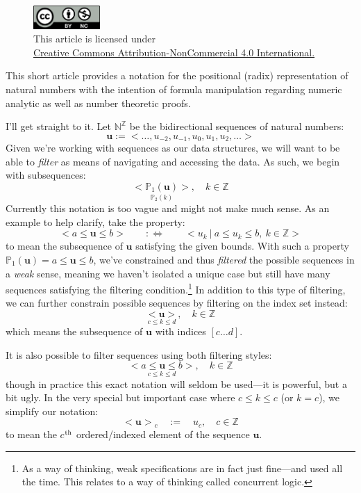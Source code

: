 \documentclass[twoside]{article}
\renewcommand{\th}{$ ^{\mbox{\scriptsize th}} $ }
\newcommand{\seq}[1][u]{\ensuremath{<\!#1\!>}}
\newcommand{\bseq}[1][u]{\ensuremath{<\!\!\bm{#1}\!\!>}}
\begin{document}
\begin{figure}[h]
\centering
\includegraphics[width=1in]{cc-by-nc.png}\\[0.1in]
\tiny This article is licensed under \\
\href{http://creativecommons.org/licenses/by-nc/4.0/}
{Creative Commons Attribution-NonCommercial 4.0 International.}\\[0.3in]
\end{figure}

This short article provides a notation for the positional (radix) representation of natural numbers with the intention
of formula manipulation regarding numeric analytic as well as number theoretic proofs.

I'll get straight to it. Let $ \mathbb{N}^\mathbb{Z} $ be the bidirectional sequences of natural numbers:
$$ \bm{u}:=<\ldots, u_{-2}, u_{-1}, u_0, u_{1}, u_{2},\ldots> $$
Given we're working with sequences as our data structures, we will want to be able to \emph{filter} as means
of navigating and accessing the data. As such, we begin with subsequences:
$$ \underset{\mathbb{P}_2(k)}{\seq[\mathbb{P}_1(\bm{u})]},\quad k\in\mathbb{Z} $$
Currently this notation is too vague and might not make much sense. As an example to help clarify, take the property:
$$ \seq[a\le\bm{u}\le b]\qquad:\Longleftrightarrow\qquad <u_k\ |\ a\le u_k\le b,\ k\in\mathbb{Z}> $$
to mean the subsequence of $ \bm{u} $ satisfying the given bounds.  With such a property $ \mathbb{P}_1(\bm{u})=a\le\bm{u}\le b $,
we've constrained and thus \emph{filtered} the possible sequences in a \emph{weak} sense, meaning we haven't isolated a
unique case but still have many sequences satisfying the filtering condition.\footnote{As a way of thinking, weak specifications
are in fact just fine---and used all the time. This relates to a way of thinking called concurrent logic.}
In addition to this type of filtering, we can further constrain possible sequences by filtering on the index set instead:
$$ \underset{c\le k\le d}{\bseq},\quad k\in\mathbb{Z} $$
which means the subsequence of $ \bm{u} $ with indices $ [c\ldots d] $.

It is also possible to filter sequences using both filtering styles:
$$ \underset{c\le k\le d}{\seq[a\le\bm{u}\le b]},\quad k\in\mathbb{Z} $$
though in practice this exact notation will seldom be used---it is powerful, but a bit ugly.
In the very special but important case where $ c\le k\le c $ (or $ k=c $), we simplify our notation:
$$ \bseq_c\quad:=\quad u_c,\quad c\in\mathbb{Z} $$
to mean the $ c $\th ordered/indexed element of the sequence $ \bm{u} $.
\end{document}
